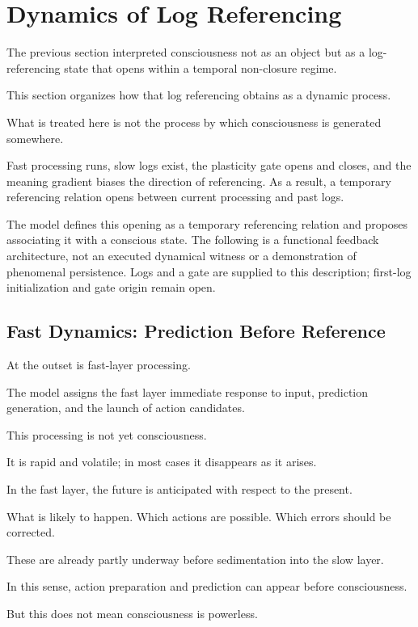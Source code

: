 \section{Dynamics of Log Referencing}


The previous section interpreted consciousness not as an object but as a log-referencing state that opens within a temporal non-closure regime.

This section organizes how that log referencing obtains as a dynamic process.

What is treated here is not the process by which consciousness is generated somewhere.

Fast processing runs, slow logs exist, the plasticity gate opens and closes, and the meaning gradient biases the direction of referencing. As a result, a temporary referencing relation opens between current processing and past logs.

The model defines this opening as a temporary referencing relation and proposes associating it with a conscious state. The following is a functional feedback architecture, not an executed dynamical witness or a demonstration of phenomenal persistence. Logs and a gate are supplied to this description; first-log initialization and gate origin remain open.

\subsection{Fast Dynamics: Prediction Before Reference}


At the outset is fast-layer processing.

The model assigns the fast layer immediate response to input, prediction generation, and the launch of action candidates.

This processing is not yet consciousness.

It is rapid and volatile; in most cases it disappears as it arises.

In the fast layer, the future is anticipated with respect to the present.

What is likely to happen. Which actions are possible. Which errors should be corrected.

These are already partly underway before sedimentation into the slow layer.

In this sense, action preparation and prediction can appear before consciousness.

But this does not mean consciousness is powerless.

